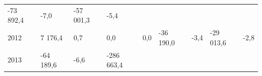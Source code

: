\begin{longtable}[]{@{}lllllllll@{}}
\begin{minipage}[t]{0.12\columnwidth}
-73 892,4\strut
\end{minipage} & \begin{minipage}[t]{0.06\columnwidth}\raggedright
-7,0\strut
\end{minipage} & \begin{minipage}[t]{0.09\columnwidth}\raggedright
-57 001,3\strut
\end{minipage} & \begin{minipage}[t]{0.06\columnwidth}\raggedright
-5,4\strut
\end{minipage}\tabularnewline
\begin{minipage}[t]{0.05\columnwidth}\raggedright
2012\strut
\end{minipage} & \begin{minipage}[t]{0.10\columnwidth}\raggedright
7 176,4\strut
\end{minipage} & \begin{minipage}[t]{0.06\columnwidth}\raggedright
0,7\strut
\end{minipage} & \begin{minipage}[t]{0.16\columnwidth}\raggedright
0,0\strut
\end{minipage} & \begin{minipage}[t]{0.06\columnwidth}\raggedright
0,0\strut
\end{minipage} & \begin{minipage}[t]{0.12\columnwidth}\raggedright
-36 190,0\strut
\end{minipage} & \begin{minipage}[t]{0.06\columnwidth}\raggedright
-3,4\strut
\end{minipage} & \begin{minipage}[t]{0.09\columnwidth}\raggedright
-29 013,6\strut
\end{minipage} & \begin{minipage}[t]{0.06\columnwidth}\raggedright
-2,8\strut
\end{minipage}\tabularnewline
\begin{minipage}[t]{0.05\columnwidth}\raggedright
2013\strut
\end{minipage} & \begin{minipage}[t]{0.10\columnwidth}\raggedright
-64 189,6\strut
\end{minipage} & \begin{minipage}[t]{0.06\columnwidth}\raggedright
-6,6\strut
\end{minipage} & \begin{minipage}[t]{0.16\columnwidth}\raggedright
-286 663,4\strut
\end{minipage} & \begin{minipage}[t]{0.06\columnwidth}\raggedright

\end{minipage}
\end{longtable}
